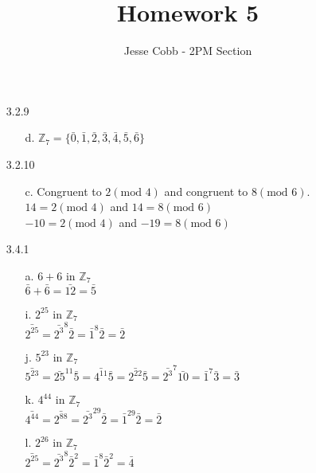 \documentclass[11pt]{amsart}
\theoremstyle{definition}
\begin{document}
\title{Homework 5}

\author{Jesse Cobb - 2PM Section}

\maketitle

\begin{itemize}

\item[3.2.9]
\begin{itemize}
    \item[d.] $\mathbb{Z}_7=\{\bar 0,\bar 1,\bar 2,\bar 3,\bar 4,\bar 5,\bar 6\}$
    
\end{itemize}

\item[3.2.10]
\begin{itemize}
    \item[c.] Congruent to $2(\text{mod }4)$ and congruent to $8(\text{mod }6)$.\\
              $14=2(\text{mod }4)$ and $14=8(\text{mod }6)$ \\
              $-10=2(\text{mod }4)$ and $-19=8(\text{mod }6)$
    
\end{itemize}

\item[3.4.1]
\begin{itemize}
    \item[a.] $6+6$ in $\mathbb{Z}_7$ \\
              $\bar 6+\bar 6=\bar{12}=\bar 5$

    \item[i.] $2^{25}$ in $\mathbb{Z}_7$ \\
              $\bar{2^{25}}=\bar{2^3}^8\bar2=\bar1^8\bar2=\bar 2$

    \item[j.] $5^{23}$ in $\mathbb{Z}_7$ \\
              $\bar{5^{23}}=\bar{25}^{11}\bar5=\bar{4^{11}}\bar5=\bar{2^{22}}\bar5
              =\bar{2^3}^7\bar{10}=\bar1^7\bar3=\bar3$

    \item[k.] $4^{44}$ in $\mathbb{Z}_7$ \\
              $\bar{4^{44}}=\bar{2^{88}}=\bar{2^3}^{29}\bar2=\bar1^{29}\bar2=\bar2$

    \item[l.] $2^{26}$ in $\mathbb{Z}_7$ \\
              $\bar{2^{25}}=\bar{2^3}^8\bar2^2=\bar1^8\bar2^2=\bar 4$
    

\end{itemize}
\end{itemize}
\end{document}
